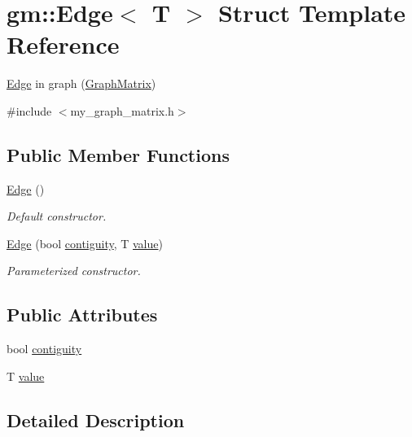 \hypertarget{structgm_1_1_edge}{}\section{gm\+:\+:Edge$<$ T $>$ Struct Template Reference}
\label{structgm_1_1_edge}


\mbox{\hyperlink{structgm_1_1_edge}{Edge}} in graph (\mbox{\hyperlink{classgm_1_1_graph_matrix}{Graph\+Matrix}})  




{\ttfamily \#include $<$my\+\_\+graph\+\_\+matrix.\+h$>$}

\subsection*{Public Member Functions}
\begin{DoxyCompactItemize}
\item 
\mbox{\hyperlink{structgm_1_1_edge_a16a869644977808f26b775d0f53128f9}{Edge}} ()
\begin{DoxyCompactList}\small\item\em Default constructor. \end{DoxyCompactList}\item 
\mbox{\hyperlink{structgm_1_1_edge_a32c86440a158bba7235181bd9e1c70a3}{Edge}} (bool \mbox{\hyperlink{structgm_1_1_edge_ad9bbe3016236ffff899a0b982e96a6cd}{contiguity}}, T \mbox{\hyperlink{structgm_1_1_edge_a45d07f827a6133ea2179fdbebe0867f1}{value}})
\begin{DoxyCompactList}\small\item\em Parameterized constructor. \end{DoxyCompactList}\end{DoxyCompactItemize}
\subsection*{Public Attributes}
\begin{DoxyCompactItemize}
\item 
bool \mbox{\hyperlink{structgm_1_1_edge_ad9bbe3016236ffff899a0b982e96a6cd}{contiguity}}
\item 
T \mbox{\hyperlink{structgm_1_1_edge_a45d07f827a6133ea2179fdbebe0867f1}{value}}
\end{DoxyCompactItemize}


\subsection{Detailed Description}
